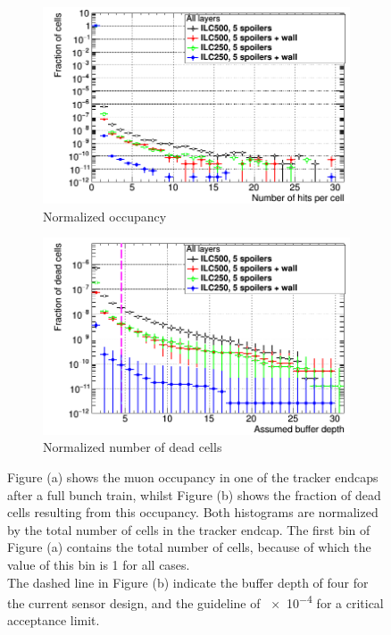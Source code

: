    \begin{figure}
 \centering
  \begin{subfigure}[b]{0.49\textwidth}
   \centering
    \includegraphics[width=\textwidth]{Figures/BDS_muons/Occupancy_Comparison_All_layers_wrt_cells_SiTrackerEndcap.png}
   \caption{Normalized occupancy}
   \end{subfigure}
   \hfill
    \begin{subfigure}[b]{0.49\textwidth}
   \centering
    \includegraphics[width=\textwidth]{Figures/BDS_muons/Occupancy_Comparison_All_layers_deadcells_SiTrackerEndcap.png}
   \caption{Normalized number of dead cells}
   \end{subfigure}
   \caption[\sid tracker endcap occupancy from BDS muons]{Figure (a) shows the muon occupancy in one of the \sid tracker endcaps after a full bunch train, whilst Figure (b) shows the fraction of dead cells resulting from this occupancy.
   Both histograms are normalized by the total number of cells in the tracker endcap.
   The first bin of Figure (a) contains the total number of cells, because of which the value of this bin is 1 for all cases.
   \\The dashed line in Figure (b) indicate the buffer depth of four for the current sensor design, and the guideline of \num{e-4} for a critical acceptance limit.}
   \label{fig:BDS_Muons:SiTrackerEndcap}
 \end{figure}
